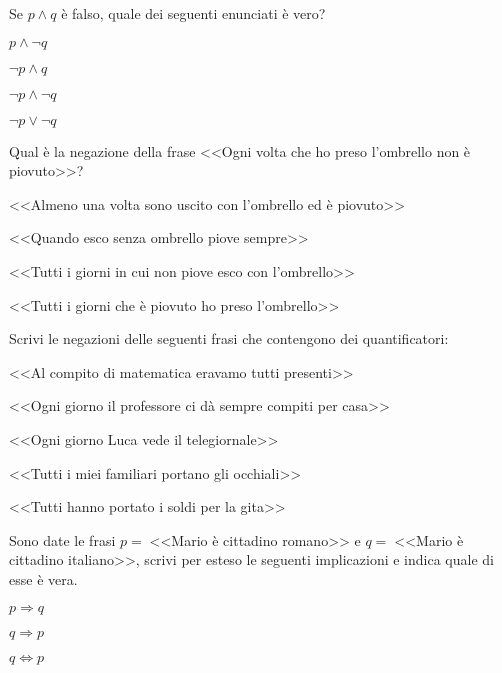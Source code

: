 \begin{esercizio}
\label{ese:0.11}
Se $p\wedge q$ è falso, quale dei seguenti enunciati è vero?
\begin{multicols}{4}
\begin{enumeratea}
\item $p\wedge \neg q$
\item $\neg p\wedge q$
\item $\neg p\wedge\neg q$
\item $\neg p\vee\neg q$
\end{enumeratea}
\end{multicols}
\end{esercizio}

\begin{esercizio}
\label{ese:0.12}
Qual è la negazione della frase <<Ogni volta che ho preso l'ombrello non è piovuto>>?
\begin{enumeratea}
\item <<Almeno una volta sono uscito con l'ombrello ed è piovuto>>
\item <<Quando esco senza ombrello piove sempre>>
\item <<Tutti i giorni in cui non piove esco con l'ombrello>>
\item <<Tutti i giorni che è piovuto ho preso l'ombrello>>
\end{enumeratea}
\end{esercizio}

\begin{esercizio}
\label{ese:0.13}
Scrivi le negazioni delle seguenti frasi che contengono dei quantificatori:
\begin{enumeratea}
\item <<Al compito di matematica eravamo tutti presenti>>
\item <<Ogni giorno il professore ci dà sempre compiti per casa>>
\item <<Ogni giorno Luca vede il telegiornale>>
\item <<Tutti i miei familiari portano gli occhiali>>
\item <<Tutti hanno portato i soldi per la gita>>
\end{enumeratea}
\end{esercizio}

\begin{esercizio}
\label{ese:0.14}
Sono date le frasi $p=\;$<<Mario è cittadino romano>> e $q=\;$<<Mario è cittadino italiano>>, scrivi per esteso le seguenti implicazioni e indica quale di esse è vera.
\begin{multicols}{3}
\begin{enumeratea}
\item $p\Rightarrow q$		\tab\boxV\quad\boxF
\item $q\Rightarrow p$		\tab\boxV\quad\boxF
\item $q\Leftrightarrow p$	\tab\boxV\quad\boxF
\end{enumeratea}
\end{multicols}
\end{esercizio}

